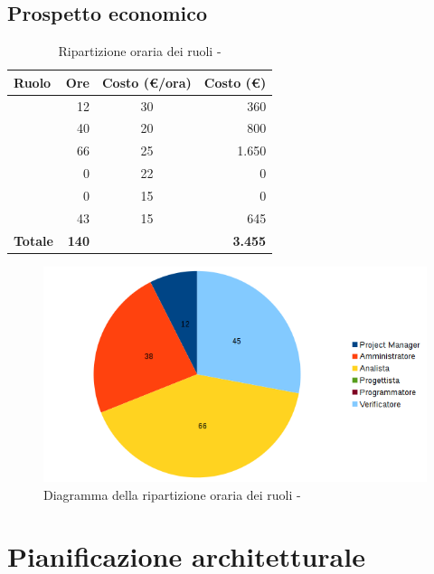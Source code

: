 \documentclass[12pt,a4paper]{article}
\begin{document}
\newpage
\subsection{Prospetto economico}

\begin{table}[H]
	\begin{center}
		\begin{tabular}{l r c r}
			\toprule
			\textbf{Ruolo}	& \textbf{Ore} & \textbf{Costo (\euro/ora)}	& \textbf{Costo (\euro)} \\
			\midrule
			\midrule
			\RE & 12 & 30 & 360\\
			\midrule
			\AM & 40 & 20 & 800\\ 
			\midrule
			\AN & 66 & 25 & 1.650\\ 
			\midrule
			\PG & 0 & 22 & 0\\ 
			\midrule
			\PR & 0 & 15 & 0\\ 
			\midrule
			\VR & 43 & 15 & 645\\ 
			\midrule
			\textbf{Totale} & \textbf{140} &  & \textbf{3.455}\\
			\bottomrule
		\end{tabular}
		\caption{Ripartizione oraria dei ruoli - \FA}
	\end{center}
\end{table}

\begin{center}
	\begin{figure}[H]
		\centering
		\includegraphics[width=\textwidth]{diagrammaTortaAnalisiTotaleOre.png}
		\caption{Diagramma della ripartizione oraria dei ruoli - \FA}
	\end{figure}
\end{center}

\newpage

\section{Pianificazione architetturale} %
\end{document}

